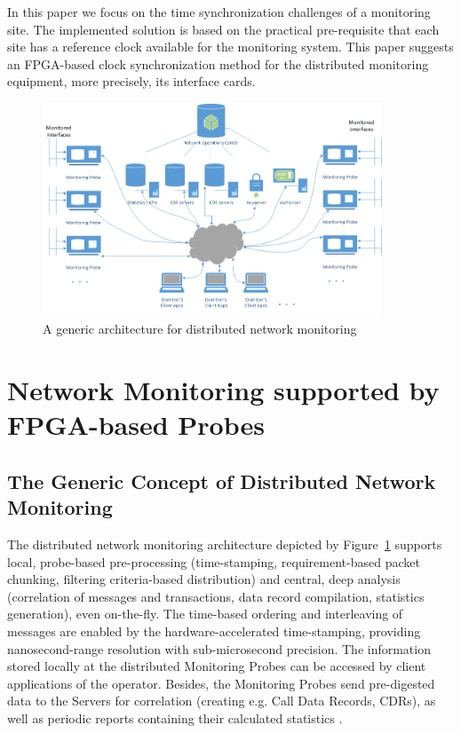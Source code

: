 \documentclass[journal]{IEEEtran}
\begin{document}
In this paper we focus on the time synchronization challenges of a monitoring site. The implemented solution is based on the practical pre-requisite that each site has a reference clock available for the monitoring system. This paper suggests an FPGA-based clock synchronization method for the distributed monitoring equipment, more precisely, its interface cards.

\begin{figure}[!htb]
    \centering
    \includegraphics[width=0.9\textwidth]{figures_raw/Network_monitoring.png}
    \caption{A generic architecture for distributed network monitoring}
    \label{fig:network_monitoring}
\end{figure}

\section{Network Monitoring supported by FPGA-based Probes}\label{sec:NetMon}
\subsection{The Generic Concept of Distributed Network Monitoring}

The distributed network monitoring architecture depicted by Figure~\ref{fig:network_monitoring} supports local, probe-based pre-processing (time-stamping, requirement-based packet chunking, filtering criteria-based distribution) and central, deep analysis (correlation of messages and transactions, data record compilation, statistics generation), even on-the-fly. The time-based ordering and interleaving of messages are enabled by the hardware-accelerated time-stamping, providing nanosecond-range resolution with sub-microsecond precision. The information stored locally at the distributed Monitoring Probes can be accessed by client applications of the operator. Besides, the Monitoring Probes send pre-digested data to the Servers for correlation (creating e.g. Call Data Records, CDRs), as well as periodic reports containing their calculated statistics \cite{Tatai_mobile_analysis}.
\end{document}
